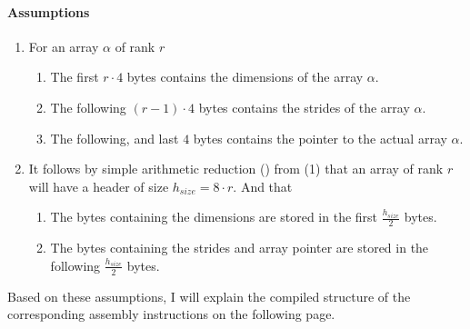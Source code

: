 \paragraph{Assumptions}
\begin{enumerate}
	\item For an array $\alpha$ of rank $r$
	\begin{enumerate}
		\item The first $r \cdot 4$ bytes contains the dimensions of the array
		$\alpha$.
		\item The following $(r - 1) \cdot 4$ bytes contains the strides of
		the array $\alpha$.
		\item The following, and last $4$ bytes contains the pointer to the
		actual array $\alpha$.
	\end{enumerate}
	\item It follows by simple arithmetic reduction
	() from (1) that an
	array of
	rank $r$ will have a header of size $h_{size} = 8 \cdot r$. And that
	\begin{enumerate}
		\item The bytes containing the dimensions are stored in the first
		$\frac{h_{size}}{2}$ bytes.
		\item The bytes containing the strides and array pointer are stored in
		the following $\frac{h_{size}}{2}$ bytes.
	\end{enumerate}
\end{enumerate}

Based on these assumptions, I will explain the compiled structure of the
corresponding assembly instructions on the following page.

\newpage
